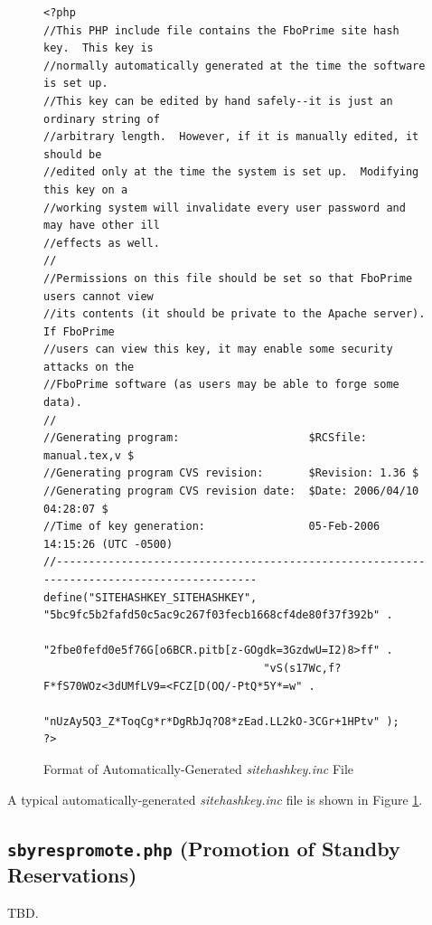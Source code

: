 \documentclass[letterpaper,10pt,titlepage]{article}
\begin{document}
\begin{figure}
\begin{scriptsize}
\begin{verbatim}
<?php
//This PHP include file contains the FboPrime site hash key.  This key is
//normally automatically generated at the time the software is set up.
//This key can be edited by hand safely--it is just an ordinary string of
//arbitrary length.  However, if it is manually edited, it should be
//edited only at the time the system is set up.  Modifying this key on a
//working system will invalidate every user password and may have other ill
//effects as well.
//
//Permissions on this file should be set so that FboPrime users cannot view
//its contents (it should be private to the Apache server).  If FboPrime
//users can view this key, it may enable some security attacks on the
//FboPrime software (as users may be able to forge some data).
//
//Generating program:                    $RCSfile: manual.tex,v $
//Generating program CVS revision:       $Revision: 1.36 $
//Generating program CVS revision date:  $Date: 2006/04/10 04:28:07 $
//Time of key generation:                05-Feb-2006 14:15:26 (UTC -0500)
//------------------------------------------------------------------------------------------
define("SITEHASHKEY_SITEHASHKEY", "5bc9fc5b2fafd50c5ac9c267f03fecb1668cf4de80f37f392b" .
                                  "2fbe0fefd0e5f76G[o6BCR.pitb[z-GOgdk=3GzdwU=I2)8>ff" .
                                  "vS(s17Wc,f?F*fS70WOz<3dUMfLV9=<FCZ[D(OQ/-PtQ*5Y*=w" .
                                  "nUzAy5Q3_Z*ToqCg*r*DgRbJq?O8*zEad.LL2kO-3CGr+1HPtv" );
?>
\end{verbatim}
\end{scriptsize}
\caption{Format of Automatically-Generated \emph{sitehashkey.inc} File}
\label{fig:ssas0:shkg0:00}
\end{figure}

A typical automatically-generated 
\emph{sitehashkey.inc} file is shown in Figure \ref{fig:ssas0:shkg0:00}.


\subsection{\texttt{sbyrespromote.php} (Promotion of Standby Reservations)}
\label{ssas0:spsr0}

TBD.

\end{document}
